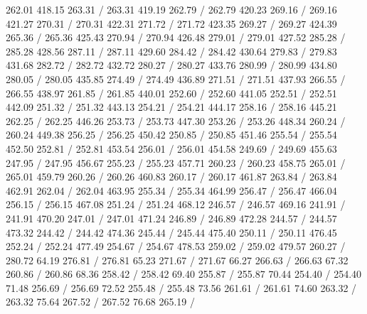 { 262.01 418.15 263.31 /
 263.31 419.19 262.79 /
 262.79 420.23 269.16 /
 269.16 421.27 270.31 /
 270.31 422.31 271.72 /
 271.72 423.35 269.27 /
 269.27 424.39 265.36 /
 265.36 425.43 270.94 /
 270.94 426.48 279.01 /
 279.01 427.52 285.28 /
 285.28 428.56 287.11 /
 287.11 429.60 284.42 /
 284.42 430.64 279.83 /
 279.83 431.68 282.72 /
 282.72 432.72 280.27 /
 280.27 433.76 280.99 /
 280.99 434.80 280.05 /
 280.05 435.85 274.49 /
 274.49 436.89 271.51 /
 271.51 437.93 266.55 /
 266.55 438.97 261.85 /
 261.85 440.01 252.60 /
 252.60 441.05 252.51 /
 252.51 442.09 251.32 /
 251.32 443.13 254.21 /
 254.21 444.17 258.16 /
 258.16 445.21 262.25 /
 262.25 446.26 253.73 /
 253.73 447.30 253.26 /
 253.26 448.34 260.24 /
 260.24 449.38 256.25 /
 256.25 450.42 250.85 /
 250.85 451.46 255.54 /
 255.54 452.50 252.81 /
 252.81 453.54 256.01 /
 256.01 454.58 249.69 /
 249.69 455.63 247.95 /
 247.95 456.67 255.23 /
 255.23 457.71 260.23 /
 260.23 458.75 265.01 /
 265.01 459.79 260.26 /
 260.26 460.83 260.17 /
 260.17 461.87 263.84 /
 263.84 462.91 262.04 /
 262.04 463.95 255.34 /
 255.34 464.99 256.47 /
 256.47 466.04 256.15 /
 256.15 467.08 251.24 /
 251.24 468.12 246.57 /
 246.57 469.16 241.91 /
 241.91 470.20 247.01 /
 247.01 471.24 246.89 /
 246.89 472.28 244.57 /
 244.57 473.32 244.42 /
 244.42 474.36 245.44 /
 245.44 475.40 250.11 /
 250.11 476.45 252.24 /
 252.24 477.49 254.67 /
 254.67 478.53 259.02 /
 259.02 479.57 260.27 /
\setsolid
{} 280.72 64.19 276.81 /
 276.81 65.23 271.67 /
 271.67 66.27 266.63 /
 266.63 67.32 260.86 /
 260.86 68.36 258.42 /
 258.42 69.40 255.87 /
 255.87 70.44 254.40 /
 254.40 71.48 256.69 /
 256.69 72.52 255.48 /
 255.48 73.56 261.61 /
 261.61 74.60 263.32 /
 263.32 75.64 267.52 /
 267.52 76.68 265.19 /
}
